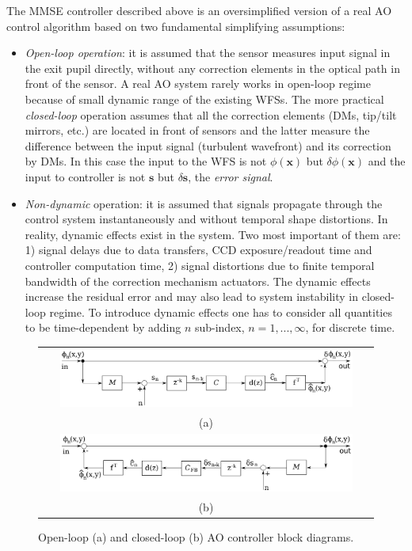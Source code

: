 The MMSE controller described above is an oversimplified version of a real AO
control algorithm based on two fundamental simplifying assumptions:
\begin{itemize}
	\item \emph{Open-loop operation}:  it is assumed
	that the sensor measures input signal in the exit pupil directly,
	without any correction elements in the optical path in front of the sensor.
	A real AO system rarely works in open-loop regime because of small dynamic
	range of the existing WFSs. The more practical \emph{closed-loop} operation
	assumes that all the correction elements (DMs, tip/tilt mirrors, etc.) are
	located in front of sensors and the latter measure the difference between
	the input signal (turbulent wavefront) and its correction by DMs. In this
	case the input to the WFS is not
	$\phi(\bm{x})$ but $\delta \phi(\bm{x})$ and the input to
	controller is not $\bm{s}$ but $\delta \bm{s}$, the \emph{error signal}.
  \item \emph{Non-dynamic} operation:  it is
  assumed that signals propagate through the control system instantaneously
  and without temporal shape distortions. In reality, dynamic effects exist in
  the system. Two most important of them are: 1) signal delays due to
  data transfers, CCD exposure/readout time and controller computation time,
  2) signal distortions due to finite temporal bandwidth of the correction
  mechanism actuators. The dynamic effects increase the residual error and may
  also lead to system instability in closed-loop regime. To introduce dynamic
  effects one has to consider all quantities to be time-dependent by adding
  $n$ sub-index, $n=1,...,\infty$, for discrete time.
\end{itemize}

\begin{figure}[htp]
\begin{center}
\begin{tabular}{c}
 \includegraphics[width = 0.9\textwidth]{Forward.png} \\
 (a) \\
 \includegraphics[width = 0.9\textwidth]{Back.png} \\
 (b) \\
\end{tabular}
\end{center}
\caption{Open-loop (a) and closed-loop (b) AO controller block diagrams.}
\label{fig:forward-back}
\end{figure}

